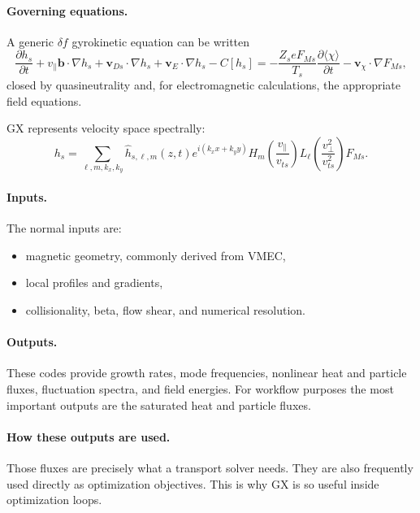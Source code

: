 \documentclass[11pt]{article}
\begin{document}
\paragraph{Governing equations.}
A generic $\delta f$ gyrokinetic equation can be written
\begin{equation}
\frac{\partial h_s}{\partial t}
+
v_\parallel\mathbf{b}\cdot\nabla h_s
+
\mathbf{v}_{Ds}\cdot\nabla h_s
+
\mathbf{v}_E\cdot\nabla h_s
-
C[h_s]
=
-\frac{Z_s e F_{Ms}}{T_s}\frac{\partial\langle\chi\rangle}{\partial t}
-
\mathbf{v}_\chi\cdot\nabla F_{Ms},
\end{equation}
closed by quasineutrality and, for electromagnetic calculations, the
appropriate field equations.

GX represents velocity space spectrally:
\begin{equation}
h_s =
\sum_{\ell,m,k_x,k_y}\hat h_{s,\ell,m}(z,t)
e^{i(k_x x + k_y y)}
H_m\!\left(\frac{v_\parallel}{v_{ts}}\right)
L_\ell\!\left(\frac{v_\perp^2}{v_{ts}^2}\right)F_{Ms}.
\end{equation}

\paragraph{Inputs.}
The normal inputs are:
\begin{itemize}
  \item magnetic geometry, commonly derived from VMEC,
  \item local profiles and gradients,
  \item collisionality, beta, flow shear, and numerical resolution.
\end{itemize}

\paragraph{Outputs.}
These codes provide growth rates, mode frequencies, nonlinear heat and particle
fluxes, fluctuation spectra, and field energies. For workflow purposes the most
important outputs are the saturated heat and particle fluxes.

\paragraph{How these outputs are used.}
Those fluxes are precisely what a transport solver needs. They are also
frequently used directly as optimization objectives. This is why GX is so
useful inside optimization loops.
\end{document}
